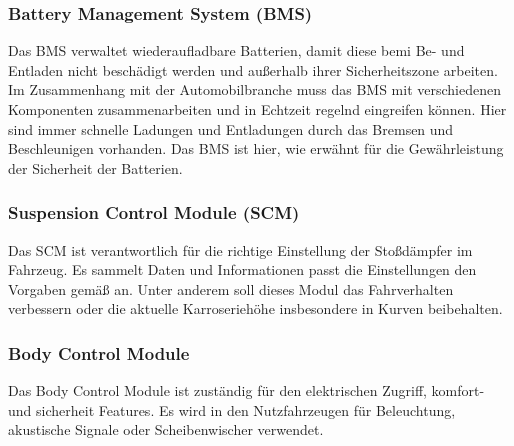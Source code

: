         \subsubsection{Battery Management System (BMS)}
        Das BMS verwaltet wiederaufladbare Batterien, damit diese bemi Be- und Entladen nicht beschädigt werden und außerhalb ihrer
        Sicherheitszone arbeiten. Im Zusammenhang mit der Automobilbranche muss das BMS mit verschiedenen Komponenten
        zusammenarbeiten und in Echtzeit regelnd eingreifen können. Hier sind immer schnelle
        Ladungen und Entladungen durch das Bremsen und Beschleunigen vorhanden. Das BMS ist hier, wie erwähnt für die
        Gewährleistung der Sicherheit der Batterien.

        \subsubsection{Suspension Control Module (SCM)}
        Das SCM ist verantwortlich für die richtige Einstellung der Stoßdämpfer im Fahrzeug. Es sammelt Daten und Informationen
        passt die Einstellungen den Vorgaben gemäß an. Unter anderem soll dieses Modul das Fahrverhalten verbessern oder
        die aktuelle Karroseriehöhe insbesondere in Kurven beibehalten.

        \subsubsection{Body Control Module}
        Das Body Control Module ist zuständig für den elektrischen Zugriff, komfort- und sicherheit Features. Es wird in
        den Nutzfahrzeugen für Beleuchtung, akustische Signale oder Scheibenwischer verwendet.